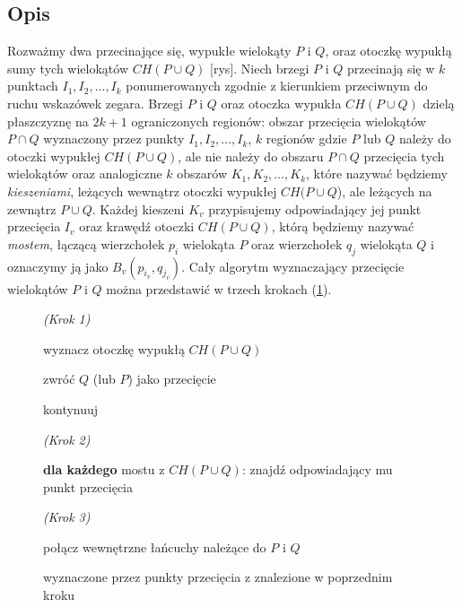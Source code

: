 \subsection{Opis}
Rozważmy dwa przecinające się, wypukłe wielokąty $P$ i $Q$, oraz
otoczkę wypukłą sumy tych wielokątów $CH(P \cup Q)$ [rys]. Niech
brzegi $P$ i $Q$ przecinają się w $k$ punktach $I_1, I_2, \ldots, I_k$
ponumerowanych zgodnie z kierunkiem przeciwnym do ruchu wskazówek
zegara. Brzegi $P$ i $Q$ oraz otoczka wypukła $CH(P \cup Q)$ dzielą
płaszczyznę na $2k + 1$ ograniczonych regionów: obszar przecięcia
wielokątów $P \cap Q$ wyznaczony przez punkty $I_1, I_2, \ldots, I_k$,
$k$ regionów gdzie $P$ lub $Q$ należy do otoczki wypukłej $CH(P \cup
Q)$, ale nie należy do obszaru $P \cap Q$ przecięcia tych wielokątów
oraz analogiczne $k$ obszarów $K_1, K_2, \ldots, K_k$, które nazywać
będziemy \emph{kieszeniami}, leżących wewnątrz otoczki wypukłej $CH(P
\cup Q$), ale leżących na zewnątrz $P \cup Q$. Każdej kieszeni $K_v$
przypisujemy odpowiadający jej punkt przecięcia $I_v$ oraz krawędź
otoczki $CH(P \cup Q)$, którą będziemy nazywać \emph{mostem}, łączącą
wierzchołek $p_i$ wielokąta $P$ oraz wierzchołek $q_j$ wielokąta $Q$ i
oznaczymy ją jako $B_{v}(p_{i_v}, q_{j_v})$. Cały algorytm
wyznaczający przecięcie wielokątów $P$ i $Q$ można przedstawić w
trzech krokach (\ref{alg:interconpol}).


\begin{figure}[htp]
\begin{algorithmic}[1]

\State \emph{(Krok 1)}

\State wyznacz otoczkę wypukłą $CH(P \cup Q)$

\State

    \State zwróć $Q$ (lub $P$) jako przecięcie

    \Else
    \State kontynuuj
\EndIf

\State

\State \emph{(Krok 2)}

\State \textbf{dla każdego} mostu z $CH(P \cup Q)$:
\State \hspace{\algorithmicindent} znajdź odpowiadający mu punkt
przecięcia

\State

\State \emph{(Krok 3)}

\State połącz wewnętrzne łańcuchy należące do $P$ i $Q$

wyznaczone przez punkty przecięcia z znalezione w poprzednim kroku

\EndProcedure
\end{algorithmic}
\caption{\label{alg:interconpol}}
\end{figure}


